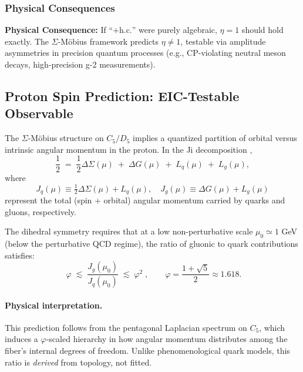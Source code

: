 \documentclass[12pt]{article}
\theoremstyle{definition}
\theoremstyle{plain}
\begin{document}
\subsubsection{Physical Consequences}

\textbf{Physical Consequence:} If ``$+ \text{h.c.}$'' were purely algebraic, $\eta=1$ should hold exactly. The $\Sigma$-M\"obius framework predicts $\eta \neq 1$, testable via amplitude asymmetries in precision quantum processes (e.g., CP-violating neutral meson decays, high-precision g-2 measurements).

\subsection{Proton Spin Prediction: EIC-Testable Observable}
\label{sec:proton_spin}

The $\Sigma$-M\"obius structure on $C_5/D_5$ implies a quantized partition of orbital versus intrinsic angular momentum in the proton. In the Ji decomposition \cite{ji2020proton},
\begin{equation}
\frac{1}{2} \;=\; \frac{1}{2}\Delta\Sigma(\mu) \;+\; \Delta G(\mu) \;+\; L_q(\mu) \;+\; L_g(\mu),
\end{equation}
where
\begin{equation}
J_q(\mu) \equiv \tfrac{1}{2}\Delta\Sigma(\mu) + L_q(\mu),\quad
J_g(\mu) \equiv \Delta G(\mu) + L_g(\mu)
\end{equation}
represent the total (spin + orbital) angular momentum carried by quarks and gluons, respectively.

The dihedral symmetry requires that at a low non-perturbative scale $\mu_0 \simeq 1$ GeV (below the perturbative QCD regime), the ratio of gluonic to quark contributions satisfies:
\begin{equation}
\boxed{\;\varphi \;\lesssim\; \frac{J_g(\mu_0)}{J_q(\mu_0)} \;\lesssim\; \varphi^2\;},\qquad 
\varphi=\frac{1+\sqrt{5}}{2} \approx 1.618.
\label{eq:proton_spin_band}
\end{equation}

\paragraph{Physical interpretation.} This prediction follows from the pentagonal Laplacian spectrum on $C_5$, which induces a $\varphi$-scaled hierarchy in how angular momentum distributes among the fiber's internal degrees of freedom. Unlike phenomenological quark models, this ratio is \emph{derived} from topology, not fitted.
\end{document}

